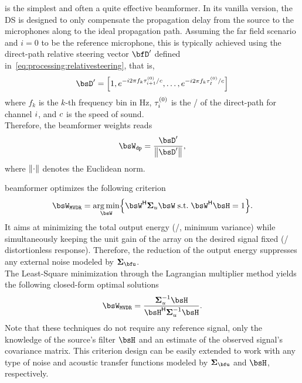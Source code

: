  is the simplest and often a quite effective beamformer.
In its vanilla version, the \ac{DS} is designed to only compensate the propagation delay from the source to the microphones along to the ideal propagation path.
Assuming the far field scenario and $i=0$ to be the reference microphone, this is typically achieved using the direct-path relative steering vector $\bfD'$ defined in~\cref{eq:processing:relativesteering}, that is,
\begin{equation}
    \bsD' = \klist{
                1,
                \cste^{-\csti 2 \pi f_k \tau_{\idxMic+1}^{(0)} / \speedOfSound},
                \ldots,
                \cste^{-\csti 2 \pi f_k \tau_{\numMics}^{(0)} / \speedOfSound}
        }
\end{equation}
where $f_k$ is the $k$-th frequency bin in Hz, $\tau_{i}^{(0)}$ is the \TOA/ of the direct-path for channel $i$, and $c$ is the speed of sound.
\\Therefore, the beamformer weights reads
\begin{equation}
    \bsW_{\mathtt{dp}} = \frac{\bsD'}{\kvvbar{\bsD'}},
\end{equation}
where $\kvvbar{\cdot}$ denotes the Euclidean norm.

 beamformer optimizes the following criterion
\begin{equation}
    \bsW_{\MVDR} = \kargmin_{\bsW} \kbrace{ \khermitian{\bsW} \xpsd_u \bsW\;\text{s.t.}\;\khermitian{\bsW} \FLTS = 1}
    .
\end{equation}
It aims at minimizing the total output energy (\ie/, minimum variance) while simultaneously keeping the unit gain of the array on the desired signal fixed (\ie/ distortionless response).
Therefore, the reduction of the output energy suppresses any external noise modeled by $\xpsd_{\bfu}$.
\\The Least-Square minimization through the Lagrangian multiplier method yields the following closed-form optimal solutions
\begin{equation}\label{eq:dechorateapp:mvdr}
    \bsW_{\MVDR} = \frac{\kinv{\xpsd}_{u} \FLTS}
                                {\khermitian{\FLTS} \kinv{\xpsd}_{u} \FLTS}
    .
\end{equation}
Note that these techniques do not require any reference signal, only the knowledge of the source's filter $\FLTS$  and an estimate of the observed signal's covariance matrix.
This criterion design can be easily extended to work with any type of noise and acoustic transfer functions modeled by $\xpsd_{\bfu}$ and $\FLTS$, respectively.

